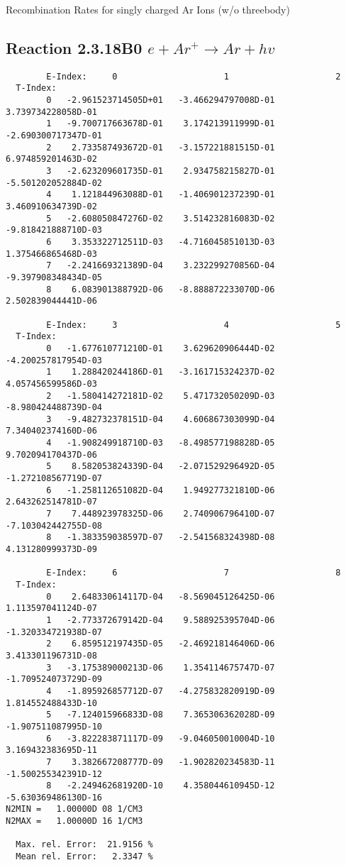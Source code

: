 \documentclass[12pt,dvipdfmx]{article}
\begin{document}
  Recombination Rates for singly  charged Ar Ions (w/o threebody)
\subsection{
Reaction 2.3.18B0  $  e + Ar^+ \rightarrow  Ar + hv $
}


\begin{small}\begin{verbatim}
        E-Index:     0                     1                     2
  T-Index:
        0   -2.961523714505D+01   -3.466294797008D-01    3.739734228058D-01
        1   -9.700717663678D-01    3.174213911999D-01   -2.690300717347D-01
        2    2.733587493672D-01   -3.157221881515D-01    6.974859201463D-02
        3   -2.623209601735D-01    2.934758215827D-01   -5.501202052884D-02
        4    1.121844963088D-01   -1.406901237239D-01    3.460910634739D-02
        5   -2.608050847276D-02    3.514232816083D-02   -9.818421888710D-03
        6    3.353322712511D-03   -4.716045851013D-03    1.375466865468D-03
        7   -2.241669321389D-04    3.232299270856D-04   -9.397908348434D-05
        8    6.083901388792D-06   -8.888872233070D-06    2.502839044441D-06

        E-Index:     3                     4                     5
  T-Index:
        0   -1.677610771210D-01    3.629620906444D-02   -4.200257817954D-03
        1    1.288420244186D-01   -3.161715324237D-02    4.057456599586D-03
        2   -1.580414272181D-02    5.471732050209D-03   -8.980424488739D-04
        3   -9.482732378151D-04    4.606867303099D-04    7.340402374160D-06
        4   -1.908249918710D-03   -8.498577198828D-05    9.702094170437D-06
        5    8.582053824339D-04   -2.071529296492D-05   -1.272108567719D-07
        6   -1.258112651082D-04    1.949277321810D-06    2.643262514781D-07
        7    7.448923978325D-06    2.740906796410D-07   -7.103042442755D-08
        8   -1.383359038597D-07   -2.541568324398D-08    4.131280999373D-09

        E-Index:     6                     7                     8
  T-Index:
        0    2.648330614117D-04   -8.569045126425D-06    1.113597041124D-07
        1   -2.773372679142D-04    9.588925395704D-06   -1.320334721938D-07
        2    6.859512197435D-05   -2.469218146406D-06    3.413301196731D-08
        3   -3.175389000213D-06    1.354114675747D-07   -1.709524073729D-09
        4   -1.895926857712D-07   -4.275832820919D-09    1.814552488433D-10
        5   -7.124015966833D-08    7.365306362028D-09   -1.907511087995D-10
        6   -3.822283871117D-09   -9.046050010004D-10    3.169432383695D-11
        7    3.382667208777D-09   -1.902820234583D-11   -1.500255342391D-12
        8   -2.249462681920D-10    4.358044610945D-12   -5.630369486130D-16
N2MIN =   1.00000D 08 1/CM3
N2MAX =   1.00000D 16 1/CM3

  Max. rel. Error:  21.9156 %
  Mean rel. Error:   2.3347 %

\end{verbatim}\end{small}
\end{document}
